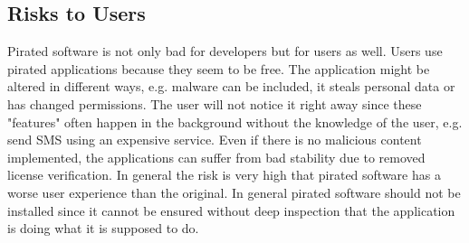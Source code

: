\subsection{Risks to Users} \label{subsection:foundation-piracy-users}
Pirated software is not only bad for developers but for users as well.
Users use pirated applications because they seem to be free.
The application might be altered in different ways, e.g. malware can be included, it steals personal data or has changed permissions.
The user will not notice it right away since these "features" often happen in the background without the knowledge of the user, e.g. send SMS using an expensive service.
Even if there is no malicious content implemented, the applications can suffer from bad stability due to removed license verification.
In general the risk is very high that pirated software has a worse user experience than the original.\cite{bitdefenderPlagiarism}\cite{lierschDeveloperThreats}
\newline
In general pirated software should not be installed since it cannot be ensured without deep inspection that the application is doing what it is supposed to do.





